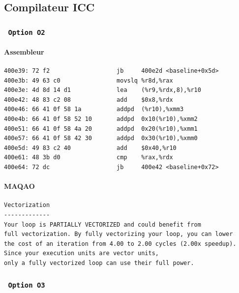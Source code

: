 \documentclass{report}
\begin{document}
      \subsection{Compilateur ICC}
      \subsubsection{ \texttt{ Option O2 } }
      \paragraph{Assembleur}
        \begin{tcolorbox}
          \begin{verbatim}
400e39:	72 f2                	jb     400e2d <baseline+0x5d>
400e3b:	49 63 c0             	movslq %r8d,%rax
400e3e:	4d 8d 14 d1          	lea    (%r9,%rdx,8),%r10
400e42:	48 83 c2 08          	add    $0x8,%rdx
400e46:	66 41 0f 58 1a       	addpd  (%r10),%xmm3
400e4b:	66 41 0f 58 52 10    	addpd  0x10(%r10),%xmm2
400e51:	66 41 0f 58 4a 20    	addpd  0x20(%r10),%xmm1
400e57:	66 41 0f 58 42 30    	addpd  0x30(%r10),%xmm0
400e5d:	49 83 c2 40          	add    $0x40,%r10
400e61:	48 3b d0             	cmp    %rax,%rdx
400e64:	72 dc                	jb     400e42 <baseline+0x72>
        \end{verbatim}
      \end{tcolorbox}
      \paragraph{MAQAO}
        \begin{tcolorbox}
          \begin{verbatim}
Vectorization
-------------
Your loop is PARTIALLY VECTORIZED and could benefit from
full vectorization. By fully vectorizing your loop, you can lower
the cost of an iteration from 4.00 to 2.00 cycles (2.00x speedup).
Since your execution units are vector units,
only a fully vectorized loop can use their full power.
        \end{verbatim}
      \end{tcolorbox}
      \subsubsection{ \texttt{ Option O3 }  }
\end{document}
